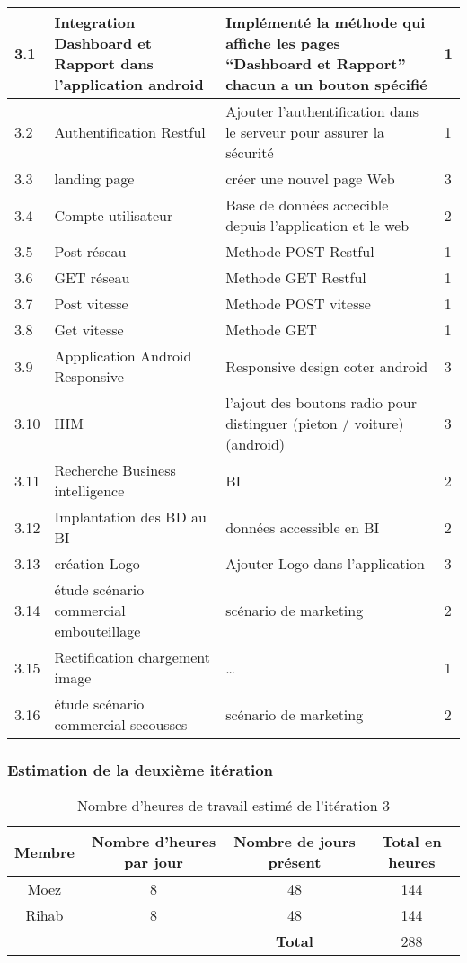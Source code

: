 \begin{center}
\begin{longtable}{| p{1cm} | p{5cm} | p{7cm} | p{1cm} |}
\hline
3.1 & Integration Dashboard et Rapport dans l'application android & Implémenté la méthode qui affiche les pages ``Dashboard et Rapport'' chacun a un bouton spécifié   & 1 \\ \hline
3.2 & Authentification Restful  & Ajouter l'authentification dans le serveur pour assurer la sécurité   & 1 \\ \hline
3.3 & landing page & créer une nouvel page Web  & 3\\ \hline
3.4 & Compte utilisateur & Base de données accecible depuis l'application et le web& 2 \\ \hline
3.5 & Post réseau & Methode POST Restful & 1 \\ \hline
3.6 & GET réseau & Methode GET Restful & 1 \\ \hline
3.7 & Post vitesse & Methode POST vitesse & 1 \\ \hline
3.8 & Get vitesse & Methode GET & 1 \\ \hline
3.9 & Appplication Android Responsive & Responsive design coter android & 3 \\ \hline
3.10 & IHM & l'ajout des boutons radio pour distinguer (pieton / voiture)(android) & 3 \\ \hline
3.11 & Recherche Business intelligence & BI & 2 \\ \hline
3.12 & Implantation des BD au BI & données accessible en BI & 2\\ \hline
3.13 & création Logo &Ajouter Logo dans l'application & 3 \\ \hline
3.14 & étude scénario commercial embouteillage & scénario de marketing& 2\\ \hline
3.15 & Rectification chargement image & \ldots & 1 \\ \hline
3.16 & étude scénario commercial secousses & scénario de marketing& 2\\ \hline
\end{longtable}
\end{center}

\subsubsection{Estimation de la deuxième itération}

\begin{table}[htbp]
    \centering
    \begin{tabular}{| c | c | c | c |}
\hline
\textbf{Membre} & \textbf{Nombre d'heures par jour} & \textbf{Nombre de jours présent} & \textbf{Total en heures} \\ \hline
\hline

Moez & 8 & 48 & 144\\ \hline
Rihab & 8 & 48 & 144 \\ \hline
\multicolumn{2}{c|}{} & \textbf{Total} & 288 \\ \cline{3-4}
    \end{tabular}
    \caption{Nombre d'heures de travail estimé de l'itération 3}
    \label{tab:sprint3-capacity}
\end{table}

